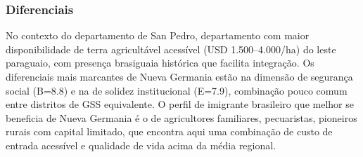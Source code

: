\subsubsection*{Diferenciais}\label{dif-nueva-germania-0207}
No contexto do departamento de San Pedro, departamento com maior disponibilidade de terra agricultável acessível (USD 1.500–4.000/ha) do leste paraguaio, com presença brasiguaia histórica que facilita integração. Os diferenciais mais marcantes de Nueva Germania estão na dimensão de segurança social (B=8.8) e na de solidez institucional (E=7.9), combinação pouco comum entre distritos de GSS equivalente. O perfil de imigrante brasileiro que melhor se beneficia de Nueva Germania é o de agricultores familiares, pecuaristas, pioneiros rurais com capital limitado, que encontra aqui uma combinação de custo de entrada acessível e qualidade de vida acima da média regional.
